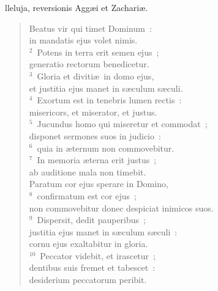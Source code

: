 \bchapter
{}lleluja, reversionis Agg\ae i et Zachari\ae . \begin{flushleft}\begin{verse}\vspace{6pt}Beatus vir qui timet Dominum~:\\ in mandatis ejus volet nimis.\\
${}^{2}$~Potens in terra erit semen ejus~;\\ generatio rectorum benedicetur.\\
${}^{3}$~Gloria et diviti\ae\ in domo ejus,\\ et justitia ejus manet in s\ae culum s\ae culi.\\
${}^{4}$~Exortum est in tenebris lumen rectis~:\\ misericors, et miserator, et justus.\\
${}^{5}$~Jucundus homo qui miseretur et commodat~;\\ disponet sermones suos in judicio~:\\
${}^{6}$~quia in \ae ternum non commovebitur.\\
${}^{7}$~In memoria \ae terna erit justus~;\\ ab auditione mala non timebit.\\ Paratum cor ejus sperare in Domino,\\
${}^{8}$~confirmatum est cor ejus~;\\ non commovebitur donec despiciat inimicos suos.\\
${}^{9}$~Dispersit, dedit pauperibus~;\\ justitia ejus manet in s\ae culum s\ae culi~:\\ cornu ejus exaltabitur in gloria.\\
${}^{10}$~Peccator videbit, et irascetur~;\\ dentibus suis fremet et tabescet~:\\ desiderium peccatorum peribit.\end{verse}\end{flushleft}




